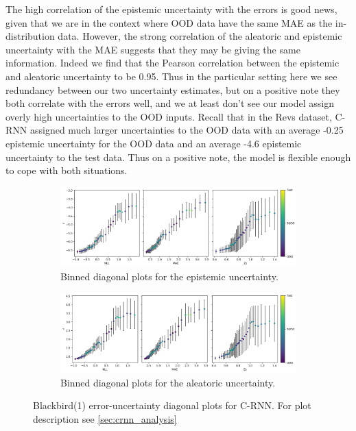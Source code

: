 The high correlation of the epistemic uncertainty with the errors is good news, given that we are in the context where OOD data have the same MAE as the in-distribution data. However, the strong correlation of the aleatoric and epistemic uncertainty with the MAE suggests that they may be giving the same information. Indeed we find that the Pearson correlation between the epistemic and aleatoric uncertainty to be 0.95. Thus in the particular setting here we see redundancy between our two uncertainty estimates, but on a positive note they both correlate with the errors well, and we at least don't see our model assign overly high uncertainties to the OOD inputs. Recall that in the Revs dataset, C-RNN assigned much larger uncertainties to the OOD data with an average -0.25 epistemic uncertainty for the OOD data and an average -4.6 epistemic uncertainty to the test data. Thus on a positive note, the model is flexible enough to cope with both situations. 

\begin{figure}[htbp]
  \centering
    \begin{subfigure}[b]{\textwidth}
        \includegraphics[width=\textwidth]{Experiments/figs/binned/bb1_crnn_epistemic.png}
        \caption{Binned diagonal plots for the epistemic uncertainty.}
    \end{subfigure}
    
    \begin{subfigure}[b]{\textwidth}
        \includegraphics[width=\textwidth]{Experiments/figs/binned/bb1_crnn_aleatoric.png}
        \caption{Binned diagonal plots for the aleatoric uncertainty.}
  \end{subfigure}
    \caption[Blackbird(1) error-uncertainty diagonal plots for C-RNN]{Blackbird(1) error-uncertainty diagonal plots for C-RNN. For plot description see \cref{sec:crnn_analysis}}
    \label{fig:bb1_uncertainty_corr}
\end{figure}

